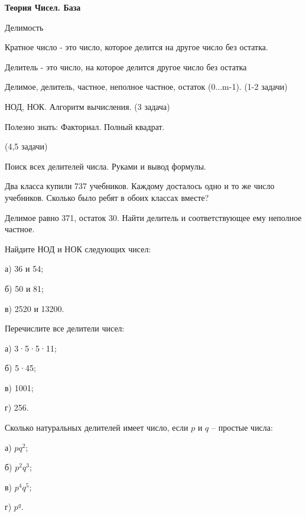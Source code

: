 \centerline{\bf \Huge Теория Чисел. База}

Делимость

Кратное число - это число, которое делится на другое число без остатка. 

Делитель - это число, на которое делится другое число без остатка

Делимое, делитель, частное, неполное частное, остаток (0...m-1). (1-2 задачи)

НОД, НОК. Алгоритм вычисления. (3 задача)

Полезно знать: Факториал. Полный квадрат.

(4,5 задачи)

Поиск всех делителей числа. Руками и вывод формулы.

  Два класса купили 737 учебников. Каждому досталось одно и то же число учебников. Сколько было ребят в обоих классах вместе?

 Делимое равно 371, остаток 30. Найти делитель и соответствующее ему неполное частное.

 Найдите НОД и НОК следующих чисел:

а) 36 и 54;

б) 50 и 81;

в) 2520 и 13200.

 Перечислите все делители чисел: 

а) 3·5·5·11;

б) 5·45; 

в) 1001;

г) 256.

Сколько натуральных делителей имеет число, если \(p\) и \(q\) – простые числа: 

а) \(pq^2\);

б) \(p^2q^3\);

в) \(p^4q^5\);

г) \(p^q\).



